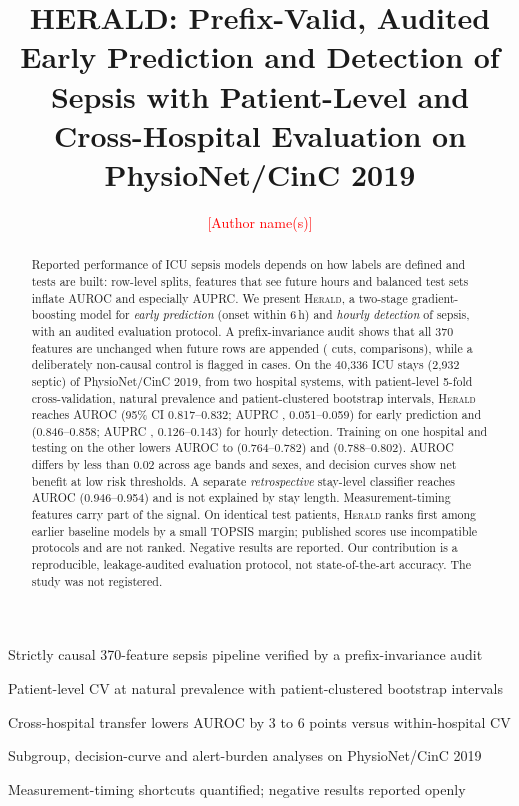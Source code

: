 \documentclass[preprint,12pt]{elsarticle}
\newcommand{\herald}{\textsc{Herald}}
\begin{document}
\begin{frontmatter}

\title{HERALD: Prefix-Valid, Audited Early Prediction and Detection of Sepsis with Patient-Level and Cross-Hospital Evaluation on PhysioNet/CinC 2019}

\author[inst1]{\textcolor{red}{[Author name(s)]}}

\begin{abstract}
Reported performance of ICU sepsis models depends on how labels are defined and tests are built: row-level splits, features that see future hours and balanced test sets inflate AUROC and especially AUPRC. We present \herald, a two-stage gradient-boosting model for \emph{early prediction} (onset within 6\,h) and \emph{hourly detection} of sepsis, with an audited evaluation protocol. A prefix-invariance audit shows that all 370 features are unchanged when future rows are appended (\NCut{} cuts, \NCmp{} comparisons), while a deliberately non-causal control is flagged in \NCtrl{} cases. On the 40{,}336 ICU stays (2{,}932 septic) of PhysioNet/CinC 2019, from two hospital systems, with patient-level 5-fold cross-validation, natural prevalence and patient-clustered bootstrap intervals, \herald{} reaches AUROC \AurocFc{} (95\% CI 0.817--0.832; AUPRC \AuprcFc{}, 0.051--0.059) for early prediction and \AurocDt{} (0.846--0.858; AUPRC \AuprcDt{}, 0.126--0.143) for hourly detection. Training on one hospital and testing on the other lowers AUROC to \AurocFcT{} (0.764--0.782) and \AurocDtT{} (0.788--0.802). AUROC differs by less than 0.02 across age bands and sexes, and decision curves show net benefit at low risk thresholds. A separate \emph{retrospective} stay-level classifier reaches AUROC \AurocStay{} (0.946--0.954) and is not explained by stay length. Measurement-timing features carry part of the signal. On identical test patients, \herald{} ranks first among earlier baseline models by a small TOPSIS margin; published scores use incompatible protocols and are not ranked. Negative results are reported. Our contribution is a reproducible, leakage-audited evaluation protocol, not state-of-the-art accuracy. The study was not registered.
\end{abstract}

\begin{highlights}
\item Strictly causal 370-feature sepsis pipeline verified by a prefix-invariance audit
\item Patient-level CV at natural prevalence with patient-clustered bootstrap intervals
\item Cross-hospital transfer lowers AUROC by 3 to 6 points versus within-hospital CV
\item Subgroup, decision-curve and alert-burden analyses on PhysioNet/CinC 2019
\item Measurement-timing shortcuts quantified; negative results reported openly
\end{highlights}


\end{frontmatter}
\end{document}
